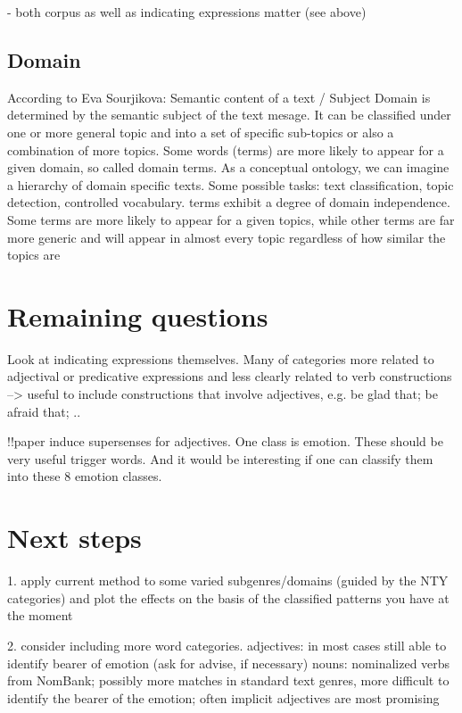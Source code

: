 - both corpus as well as indicating expressions matter (see above)

\subsection{Domain}

According to Eva Sourjikova:
Semantic content of a text / Subject
Domain is determined by the semantic subject of the text mesage. It can be classified under one
or more general topic and into a set of specific sub-topics or also a combination of more topics.
Some words (terms) are more likely to appear for a given domain, so called domain terms. As
a conceptual ontology, we can imagine a hierarchy of domain specific texts. Some possible tasks:
text classification, topic detection, controlled vocabulary. terms exhibit a degree of domain independence. Some terms are more likely to appear for a given topics, while other terms are far more
generic and will appear in almost every topic regardless of how similar the topics are

\section{Remaining questions}

Look at indicating expressions themselves.
Many of categories more related to adjectival or predicative expressions and less clearly related to verb constructions
--> useful to include constructions that involve adjectives, e.g. be glad that; be afraid that; ..

!!paper \citep{adjective_supersenses} induce supersenses for adjectives. One class is emotion. These should be very useful trigger words. And it would be interesting if one can classify them into these 8 emotion classes. 



\section{Next steps}

1. apply current method to some varied subgenres/domains (guided by the NTY categories) and plot the effects on the basis of the classified patterns you have at the moment

2. consider including more word categories.
adjectives: in most cases still able to identify bearer of emotion (ask for advise, if necessary)
nouns: nominalized verbs from NomBank; possibly more matches in standard text genres, more difficult to identify the bearer of the emotion; often implicit
adjectives are most promising

